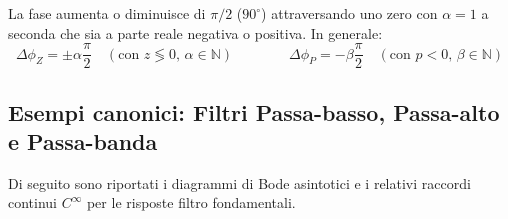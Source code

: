 \begin{important}
La fase aumenta o diminuisce di $\pi/2$ ($90^\circ$) attraversando uno zero con $\alpha=1$ a seconda che sia a parte reale negativa o positiva. In generale:
\[
    \Delta \phi_Z = \pm \alpha \frac{\pi}{2} \quad (\text{con } z \lessgtr 0, \, \alpha \in \mathbb{N}) \qquad \qquad \Delta \phi_P = -\beta \frac{\pi}{2} \quad (\text{con } p < 0, \, \beta \in \mathbb{N})
\]
\end{important}

\subsection{Esempi canonici: Filtri Passa-basso, Passa-alto e Passa-banda}

Di seguito sono riportati i diagrammi di Bode asintotici e i relativi raccordi continui $C^\infty$ per le risposte filtro fondamentali.

